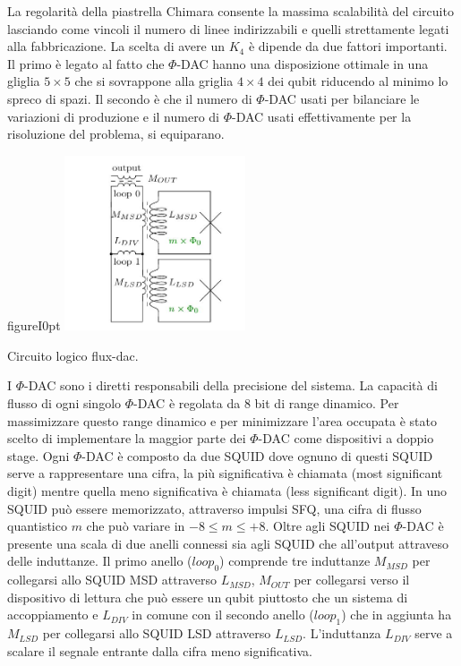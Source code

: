 La regolarità della piastrella Chimara consente la massima scalabilità del circuito lasciando come vincoli il numero di linee indirizzabili e quelli strettamente legati alla fabbricazione. La scelta di avere un $K_4$ è dipende da due fattori importanti. Il primo è legato al fatto che $\Phi$-DAC hanno una disposizione ottimale in una gliglia $5\times5$ che si sovrappone alla griglia $4\times4$ dei qubit riducendo al minimo lo spreco di spazi. Il secondo è che il numero di $\Phi$-DAC usati per bilanciare le variazioni di produzione e il numero di $\Phi$-DAC usati effettivamente per la risoluzione del problema, si equiparano.

\begin{wrapfloat}{figure}{I}{0pt}
\includegraphics[width=0.4\textwidth]{Immagini/fluxdac-logico.jpg}
\caption{Circuito logico flux-dac.}
\label{figura:fluxdac-logico}
\end{wrapfloat}
\cite{ACI}I $\Phi$-DAC sono i diretti responsabili della precisione del sistema. La capacità di flusso di ogni singolo $\Phi$-DAC è regolata da 8 bit di range dinamico. Per massimizzare questo range dinamico e per minimizzare l'area occupata è stato scelto di implementare la maggior parte dei $\Phi$-DAC come dispositivi a doppio stage. Ogni $\Phi$-DAC è composto da due SQUID dove ognuno di questi SQUID serve a rappresentare una cifra, la più significativa è chiamata  (most significant digit) mentre quella meno significativa è chiamata  (less significant digit). In uno SQUID può essere memorizzato, attraverso impulsi SFQ, una cifra di flusso quantistico $m$ che può variare in $-8 \le m \le +8$. Oltre agli SQUID nei $\Phi$-DAC è presente una scala di due anelli connessi sia agli SQUID che all'output attraveso delle induttanze.
Il primo anello ($loop_0$) comprende tre induttanze $M_{MSD}$ per collegarsi allo SQUID MSD attraverso $L_{MSD}$, $M_{OUT}$ per collegarsi verso il dispositivo di lettura che può essere un qubit piuttosto che un sistema di accoppiamento e $L_{DIV}$ in comune con il secondo anello ($loop_1$) che in aggiunta ha $M_{LSD}$ per collegarsi allo SQUID LSD attraverso $L_{LSD}$. L'induttanza $L_{DIV}$ serve a scalare il segnale entrante dalla cifra meno significativa.
